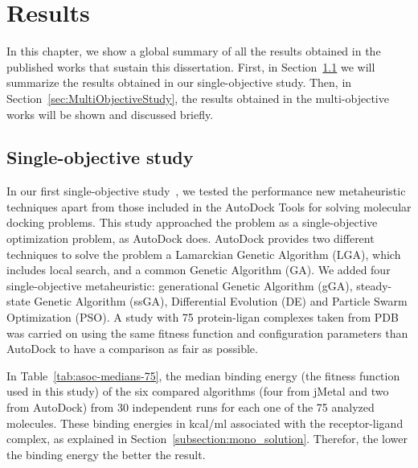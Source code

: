 \chapter{Results}
\label{chapter:results}

In this chapter, we show a global summary of all the results obtained in the published works that sustain this dissertation. First, in Section~\ref{sec:SingleObjectiveStudy} we will summarize the results obtained in our single-objective study. Then, in Section~\ref{sec:MultiObjectiveStudy}, the results obtained in the multi-objective works will be shown and discussed briefly.

\section{Single-objective study}
\label{sec:SingleObjectiveStudy}

In our first single-objective study~\cite{lopez2015asoc}, we tested the performance new metaheuristic techniques apart from those included in the AutoDock Tools for solving molecular docking problems. This study approached the problem as a single-objective optimization problem, as AutoDock does. AutoDock provides two different techniques to solve the problem a Lamarckian Genetic Algorithm (LGA), which includes local search, and a common Genetic Algorithm (GA). We added four single-objective metaheuristic: generational Genetic Algorithm (gGA), steady-state Genetic Algorithm (ssGA), Differential Evolution (DE) and Particle Swarm Optimization (PSO). A study with 75 protein-ligan complexes taken from PDB was carried on using the same fitness function and configuration parameters than AutoDock to have a comparison as fair as possible.

In Table~\ref{tab:asoc-medians-75}, the median binding energy (the fitness function used in this study) of the six compared algorithms (four from jMetal and two from AutoDock) from 30 independent runs for each one of the 75 analyzed molecules. These binding energies in kcal/ml associated with the receptor-ligand complex, as explained in Section~\ref{subsection:mono_solution}. Therefor, the lower the binding energy the better the result.

